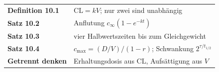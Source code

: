 \begin{merksatz}
\begin{center}
\renewcommand{\arraystretch}{1.5}
\begin{tabular}{@{}P{3.2cm}P{5.4cm}@{}}
\toprule
\textbf{Definition 10.1} & $\mathrm{CL} = kV$; nur zwei sind unabhängig\\
\textbf{Satz 10.2} & Anflutung $c_\infty(1-e^{-kt})$\\
\textbf{Satz 10.3} & vier Halbwertszeiten bis zum Gleichgewicht\\
\textbf{Satz 10.4} & $c_{\max} = (D/V)/(1-r)$; Schwankung $2^{\tau/t_{1/2}}$\\
\textbf{Getrennt denken} & Erhaltungsdosis aus $\mathrm{CL}$, Aufsättigung aus $V$\\
\bottomrule
\end{tabular}
\end{center}

\begin{center}
\begin{minipage}{0.88\textwidth}
\end{minipage}
\end{center}
\end{merksatz}
